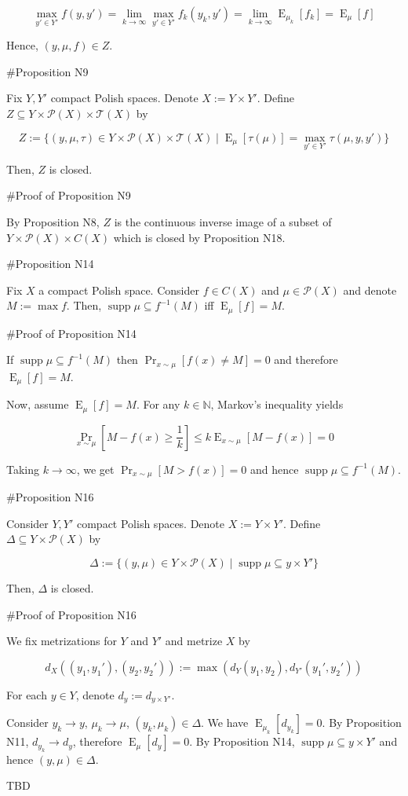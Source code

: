 \documentclass[a4paper]{article}
\DeclareMathOperator{\Supp}{supp}
\DeclareMathOperator{\Prb}{Pr}
\DeclareMathOperator{\E}{E}
\newcommand{\Nats}{\mathbb{N}}
\newcommand{\Prob}{\mathcal{P}}
\newcommand{\T}{\mathcal{T}}
\begin{document}
$$\max_{y' \in Y'} f(y,y') = \lim_{k \rightarrow \infty} \max_{y' \in Y'} f_k(y_k,y')= \lim_{k \rightarrow \infty} \E_{\mu_k}[f_k] = \E_{\mu}[f]$$

Hence, ${(y,\mu,f) \in Z}$.

\#Proposition N9

Fix ${Y,Y'}$ compact Polish spaces. Denote ${X:=Y \times Y'}$. Define ${Z \subseteq Y \times \Prob(X) \times \T(X)}$ by

$$Z:=\{(y,\mu,\tau) \in Y \times \Prob(X) \times \T(X) \mid \E_\mu[\tau(\mu)] = \max_{y' \in Y'} \tau(\mu,y,y')\}$$

Then, ${Z}$ is closed.

\#Proof of Proposition N9

By Proposition N8, ${Z}$ is the continuous inverse image of a subset of ${Y \times \Prob(X) \times C(X)}$ which is closed by Proposition N18.

\#Proposition N14

Fix ${X}$ a compact Polish space. Consider ${f \in C(X)}$ and ${\mu \in \Prob(X)}$ and denote ${M := \max f}$. Then, ${\Supp \mu \subseteq f^{-1}(M)}$ iff ${\E_\mu[f] = M}$.

\#Proof of Proposition N14

If ${\Supp \mu \subseteq f^{-1}(M)}$ then $\Prb_{x\sim \mu}[f(x) \ne M] = 0$ and therefore ${\E_\mu[f] = M}$.

Now, assume ${\E_\mu[f] = M}$. For any ${k \in \Nats}$, Markov's inequality yields 

$$\Prb_{x\sim \mu}[M - f(x) \geq \frac{1}{k}] \leq k\E_{x \sim \mu}[M - f(x)] = 0$$

Taking $k \rightarrow \infty$, we get ${\Prb_{x\sim \mu}[M > f(x)] = 0}$ and hence ${\Supp \mu \subseteq f^{-1}(M)}$.

\#Proposition N16

Consider ${Y,Y'}$ compact Polish spaces. Denote ${X:=Y \times Y'}$. Define ${\Delta \subseteq Y \times \Prob(X)}$ by

$$\Delta:=\{(y,\mu) \in Y \times \Prob(X) \mid \Supp \mu \subseteq y \times Y'\}$$

Then, ${\Delta}$ is closed.

\#Proof of Proposition N16

We fix metrizations for ${Y}$ and ${Y'}$ and metrize ${X}$ by 

$${d_X((y_1,y_1'),(y_2,y_2')):=\max(d_Y(y_1,y_2),d_{Y'}(y_1',y_2'))}$$

For each ${y \in Y}$, denote ${d_{y}:=d_{y \times Y'}}$.

Consider ${y_k \rightarrow y}$, ${\mu_k \rightarrow \mu}$, ${(y_k, \mu_k) \in \Delta}$. We have ${\E_{\mu_k}[d_{y_k}]=0}$. By Proposition N11, ${d_{y_k} \rightarrow d_y}$, therefore ${\E_\mu[d_y] = 0}$. By Proposition N14, ${\Supp \mu \subseteq y \times Y'}$ and hence ${(y,\mu) \in \Delta}$.


TBD
\end{document}

